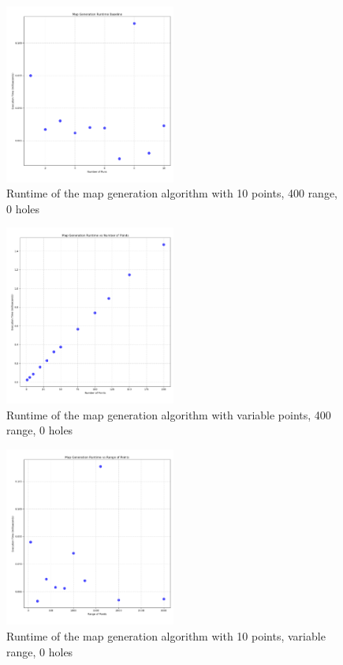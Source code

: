 \documentclass[final]{cmpreport_02}
\begin{document}
\begin{figure}[h!]
	\centering
	\includegraphics[width=0.5\textwidth]{./images/mapGenBaselineRT.png}
	\caption{Runtime of the map generation algorithm with 10 points, 400 range, 0 holes}
	\label{PE:mg:baselineRT}
\end{figure}


\begin{figure}[h!]
	\centering
	\includegraphics[width=0.5\textwidth]{./images/mapGenPointsRT.png}
	\caption{Runtime of the map generation algorithm with variable points, 400 range, 0 holes}
	\label{PE:mg:points}
\end{figure}


\begin{figure}[h!]
	\centering
	\includegraphics[width=0.5\textwidth]{./images/mapGenRangeRT.png}
	\caption{Runtime of the map generation algorithm with 10 points, variable range, 0 holes}
	\label{PE:mg:range}
\end{figure}
\end{document}
